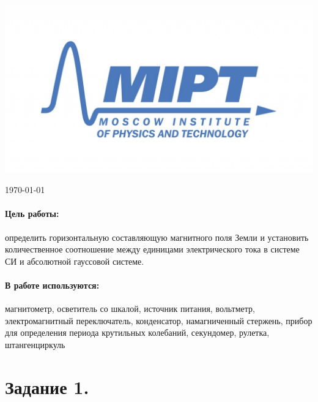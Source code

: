 \documentclass[a4paper, 12pt]{article}
\newenvironment{bottompar}{\par\vspace*{\fill}}{\clearpage}
\begin{document}
\begin{titlepage}
		\begin{bottompar}
			\begin{center}
				\includegraphics[width = 80 mm]{logo.jpg}
			\end{center}
			{\large \today}
			
		\end{bottompar}
		\vfill %
		
	\end{titlepage}
	
	\paragraph{Цель работы:} определить горизонтальную составляющую магнитного поля Земли и установить количественное соотношение между единицами электрического тока в системе СИ и абсолютной гауссовой системе.
	\paragraph{В работе используются:} магнитометр, осветитель со шкалой, источник питания, вольтметр, электромагнитный переключатель, конденсатор, намагниченный стержень, прибор для определения периода крутильных колебаний, секундомер, рулетка, штангенциркуль
	\section*{Задание 1.}
\end{document}
